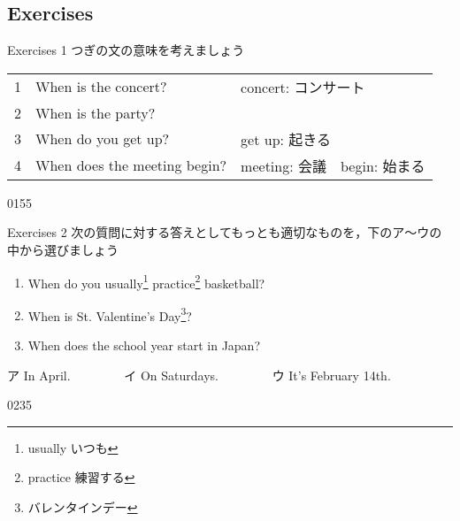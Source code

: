 \documentclass[aspectratio=169,xcolor={dvipsnames,table}]{beamer}
\begin{document}
\subsection{Exercises}
\begin{frame}[plain]{Exercises 1}
つぎの文の意味を考えましょう

\begin{tabular}{rll}
1& When is the concert? &{\scriptsize concert: コンサート} \\
2& When is the party?& \\
3& When do you get up? & {\scriptsize get up: 起きる}\\
4& When does the meeting begin?&{\scriptsize meeting: 会議　begin: 始まる} \\
\end{tabular}


\mbox{}\hfill{\tiny 0155}\,{\scriptsize {}}

\end{frame}

\begin{frame}[plain]{Exercises 2}
 次の質問に対する答えとしてもっとも適切なものを，下のア～ウの中から選びましょう

\begin{enumerate}
 \item When do you usually\footnote{usually  いつも} practice\footnote{practice  練習する} basketball?\hspace{10pt}\hspace{21pt}
 \item When is St. Valentine's Day\footnote{バレンタインデー}?\hspace{80pt}\hspace{12pt}
 \item When does the school year start in Japan?\hspace{15pt}\hspace{50pt}
\end{enumerate}

\begin{tcolorbox}
\centering
ア In April.~~~~~~~~%
イ On Saturdays.~~~~~~~~%
ウ It's February 14th. 
\end{tcolorbox}

%
\mbox{}\hfill{\tiny 0235}\,{\scriptsize {}}


\end{frame}
\end{document}
